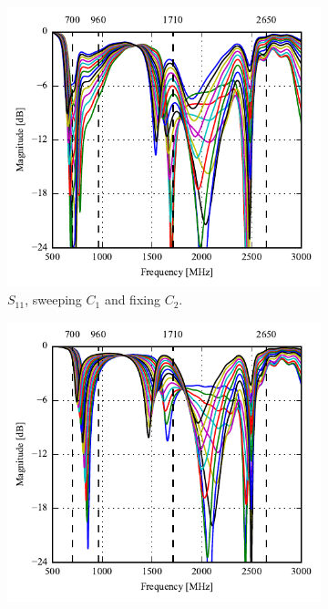 \begin{figure}[htbp]
   \begin{subfigure}[b]{0.49\linewidth}
        \centering
        \includegraphics{img/tech_sol/monopole/s11}
        \caption{$S_{11}$, sweeping $C_1$ and fixing $C_2$.}
        \label{fig:ant1_s11}
    \end{subfigure}
    \hfill
    \begin{subfigure}[b]{0.49\linewidth}
        \centering
        \includegraphics{img/tech_sol/monopole/s22}

\end{subfigure}
\end{figure}

